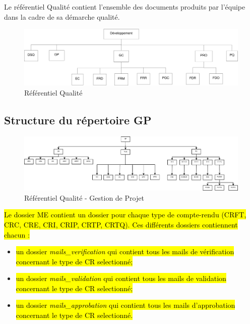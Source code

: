 
Le référentiel Qualité contient l'ensemble des documents produits par l'équipe \nomEquipe{} dans la cadre de sa démarche qualité.

\begin{figure}[ht]
         \begin{center}
         \includegraphics[scale=0.5]{images/arboQualite}
         \end{center}
         \caption{Référentiel Qualité}
 \end{figure}

\clearpage 

\subsection{Structure du répertoire GP}

\begin{figure}[ht]
         \begin{center}
         \includegraphics[scale=0.24]{images/arboGP}
         \end{center}
         \caption{Référentiel Qualité - Gestion de Projet}
 \end{figure}
 \hl{Le dossier ME contient un dossier pour chaque type de compte-rendu (CRFT, CRC, CRE, CRI, CRIP, CRTP, CRTQ). Ces différents dossiers contiennent chacun :}
 \begin{itemize}
   \item \hl{un dossier \emph{mails\_verification} qui contient tous les mails de vérification concernant le type de CR selectionné;}
   \item \hl{un dossier \emph{mails\_validation} qui contient tous les mails de validation concernant le type de CR selectionné;}
   \item \hl{un dossier \emph{mails\_approbation} qui contient tous les mails d'approbation concernant le type de CR selectionné.}
 \end{itemize}
 
